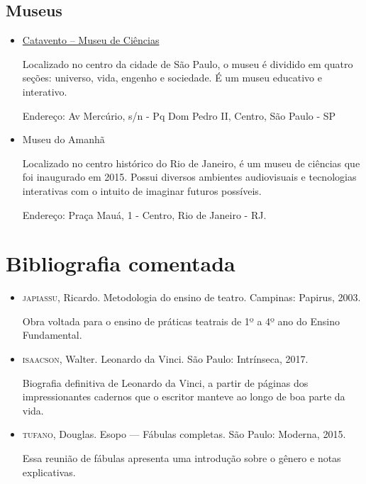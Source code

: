 \documentclass[11pt]{extarticle}
\begin{document}
\subsection{Museus}

\begin{itemize}

\item \href{https://museucatavento.org.br/}{Catavento – Museu de Ciências}

Localizado no centro da cidade de São Paulo, o museu é dividido em quatro seções: universo, vida, engenho e sociedade. É um museu educativo e interativo.

Endereço: Av Mercúrio, s/n - Pq Dom Pedro II, Centro, São Paulo - SP

\item {Museu do Amanhã}

Localizado no centro histórico do Rio de Janeiro, é um museu de ciências que foi inaugurado em 2015. Possui diversos ambientes audiovisuais e tecnologias interativas com o intuito de imaginar futuros possíveis.

Endereço: Praça Mauá, 1 - Centro, Rio de Janeiro - RJ.

\end{itemize}

\section{Bibliografia comentada}

\begin{itemize}

\item \textsc{japiassu}, Ricardo. Metodologia do ensino de teatro. Campinas: Papirus, 2003.

Obra voltada para o ensino de práticas teatrais de 1º a 4º ano do Ensino Fundamental.

\item \textsc{isaacson}, Walter. Leonardo da Vinci. São Paulo: Intrínseca, 2017.

Biografia definitiva de Leonardo da Vinci, a partir de páginas dos impressionantes cadernos que o escritor manteve ao longo de boa parte da vida.

\item \textsc{tufano}, Douglas. Esopo --- Fábulas completas. São Paulo: Moderna, 2015.
 
Essa reunião de fábulas apresenta uma introdução sobre o gênero e notas explicativas.

\end{itemize}
\end{document}

